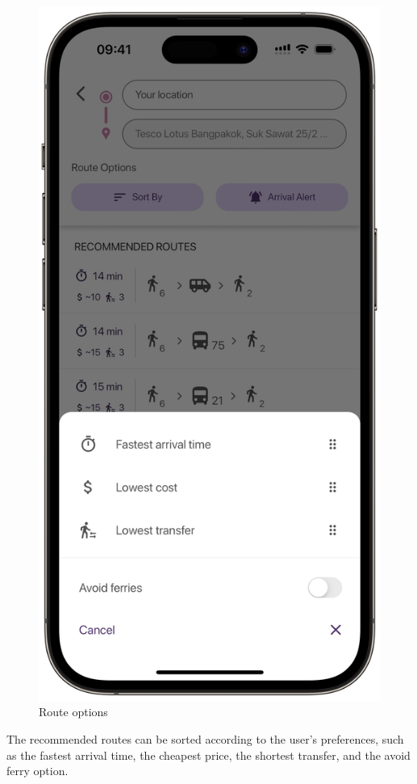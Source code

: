 \newpage
\begin{figure}[!h]
	\centering
	\includegraphics[width=0.5\linewidth]{chapter4/route_options_screen.png}
	\caption{Route options}
	\label{fig:Route options}
\end{figure}
The recommended routes can be sorted according to the user's preferences, such as the fastest arrival time, the cheapest price, the shortest transfer, and the avoid ferry option. 

